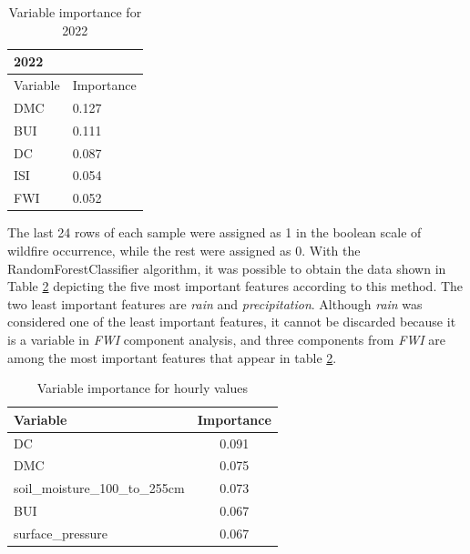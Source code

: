\begin{table}[H]
	\caption{Variable importance for 2022}
	\label{importance_2022}
	\centering
	\begin{tabular}{ll}
		\hline
		2022     &            \\ \hline
		Variable & Importance \\
		DMC      & 0.127      \\
		BUI      & 0.111      \\
		DC       & 0.087      \\
		ISI      & 0.054      \\
		FWI      & 0.052     
	\end{tabular}
\end{table}

The last 24 rows of each sample were assigned as 1 in the boolean scale of wildfire occurrence, while the rest were assigned as 0. With the RandomForestClassifier algorithm, it was possible to obtain the data shown in Table \ref{hourly_values} depicting the five most important features according to this method.
The two least important features are \textit{rain} and \textit{precipitation}. Although \textit{rain} was considered one of the least important features, it cannot be discarded because it is a variable in \textit{FWI} component analysis, and three components from \textit{FWI} are among the most important features that appear in table \ref{hourly_values}.

\begin{table}[H]
	\caption{Variable importance for hourly values}
	\centering
	\label{hourly_values}
	\begin{tabular}{lc}
		\hline
		Variable                       & \multicolumn{1}{l}{Importance} \\ \hline
		DC                             & 0.091                          \\
		DMC                            & 0.075                          \\
		soil\_moisture\_100\_to\_255cm & 0.073                          \\
		BUI                            & 0.067                          \\
		surface\_pressure              & 0.067                         
	\end{tabular}
\end{table}


